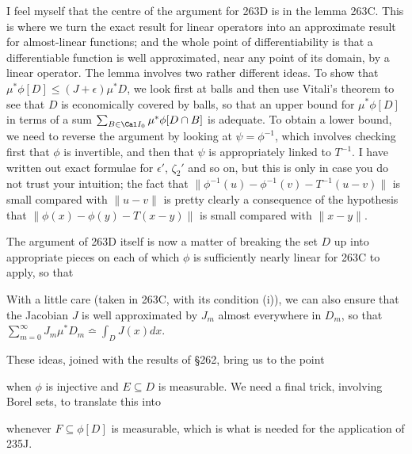 {I feel myself that the centre of the argument for 263D is in the lemma
263C.   This is where we turn the exact result for linear operators into
an approximate result for almost-linear functions;  and the whole point
of differentiability is that a differentiable function is well
approximated, near any point of its domain, by a linear
operator.   The lemma involves two rather different ideas.   To show
that $\mu^*\phi[D]\le(J+\epsilon)\mu^*D$, we look first at balls and
then use Vitali's theorem to see that $D$ is economically covered by
balls, so that an upper bound for $\mu^*\phi[D]$ in terms of a sum
$\sum_{B\in\Cal I_0}\mu^*\phi[D\cap B]$ is adequate.    To obtain a
lower bound, we need to reverse the argument by looking at
$\psi=\phi^{-1}$, which involves checking first that $\phi$ is
invertible, and then that $\psi$ is appropriately linked to $T^{-1}$.
I have written out exact formulae for $\epsilon'$, $\zeta_2'$ and so on,
but this is only in case you do not trust your intuition;  the fact that
$\|\phi^{-1}(u)-\phi^{-1}(v)-T^{-1}(u-v)\|$ is small compared with
$\|u-v\|$ is pretty clearly a consequence of the hypothesis that
$\|\phi(x)-\phi(y)-T(x-y)\|$ is small compared with $\|x-y\|$.

The argument of 263D itself is now a matter of breaking the set $D$ up
into appropriate pieces on each of which $\phi$ is sufficiently nearly
linear for 263C to apply, so that


\noindent With a little care (taken in 263C, with its condition (i)), we
can also ensure that the Jacobian $J$ is
well approximated by $J_m$ almost everywhere in $D_m$, so that
$\sum_{m=0}^{\infty}J_m\mu^*D_m\bumpeq\int_DJ(x)dx$.

These ideas, joined with the results of \S262, bring us to the point


\noindent when $\phi$ is injective and $E\subseteq D$ is measurable.
We need a final trick, involving Borel sets, to translate this into


\noindent whenever $F\subseteq\phi[D]$ is measurable, which is what is
needed for the application of 235J.

}
